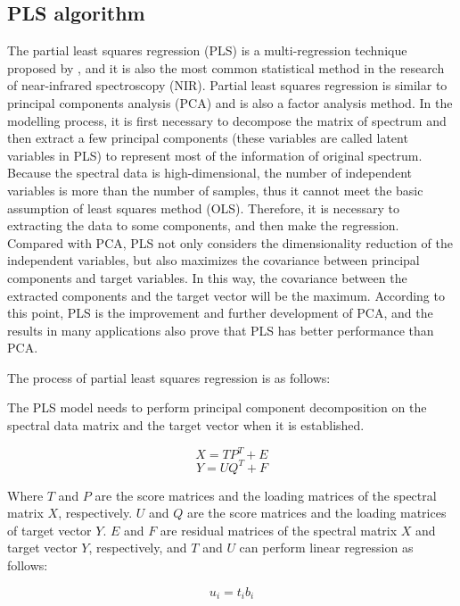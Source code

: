 \documentclass[a4paper,12pt,titlepage]{article} %
\numberwithin{equation}{section}  %
\begin{document}
	\subsection{PLS algorithm}
	\label{PLS_al}
	The partial least squares regression (PLS) is a multi-regression technique proposed by \citet{wold1984collinearity}, and it is also the most common statistical method in the research of near-infrared spectroscopy (NIR). Partial least squares regression is similar to principal components analysis (PCA) and is also a factor analysis method. In the modelling  process, it is first necessary to decompose the matrix of spectrum and then extract a few principal components (these variables are called latent variables in PLS) to represent most of the information of original spectrum. Because the spectral data is high-dimensional, the number of independent variables is more than the number of samples, thus it cannot meet the basic assumption of least squares method (OLS). Therefore, it is necessary to extracting the data to some components, and then make the regression. Compared with PCA, PLS not only considers the dimensionality reduction of the independent variables, but also maximizes the covariance between principal components and target variables. In this way, the covariance between the extracted components and the target vector will be the maximum. According to this point, PLS is the improvement and further development of PCA, and the results in many applications also prove that PLS has better performance than PCA.
	
	The process of partial least squares regression is as follows:
	
	The PLS model needs to perform principal component decomposition on the spectral data matrix and the target vector when it is established.
	
	\begin{equation}
	X=TP^T+E 
	\end{equation}
	\begin{equation}
	Y=UQ^T+F
	\end{equation}
	
	Where $T$ and $P$ are the score matrices and the loading matrices of the spectral matrix $X$, respectively. $U$ and $Q$ are the score matrices and the loading matrices of target vector $Y$. $E$ and $F$ are residual matrices of the spectral matrix $X$ and target vector $Y$, respectively, and $T$ and $U$ can perform linear regression as follows:
	
	\begin{equation}
	u_i=t_ib_i
	\label{equ:ui} 
	\end{equation}
	
\end{document}
